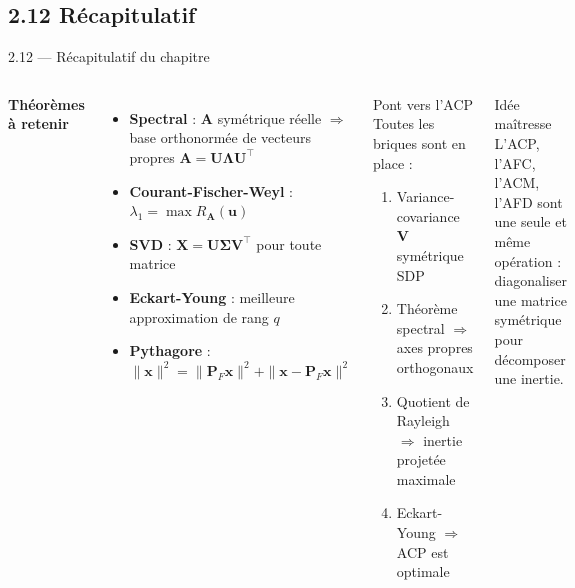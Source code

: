 \subsection{2.12 Récapitulatif}
\begin{frame}{2.12 — Récapitulatif du chapitre}
\begin{columns}[T]
\textbf{Théorèmes à retenir}
\begin{itemize}\small
  \item \textbf{Spectral} : $\mathbf{A}$ symétrique réelle
        $\Rightarrow$ base orthonormée de vecteurs propres
        $\mathbf{A} = \mathbf{U}\mathbf{\Lambda}\mathbf{U}^\top$
  \item \textbf{Courant-Fischer-Weyl} : $\lambda_1 = \max R_{\mathbf{A}}(\mathbf{u})$
  \item \textbf{SVD} : $\mathbf{X} = \mathbf{U}\mathbf{\Sigma}\mathbf{V}^\top$ pour toute matrice
  \item \textbf{Eckart-Young} : meilleure approximation de rang $q$
  \item \textbf{Pythagore} : $\|\mathbf{x}\|^2 = \|\mathbf{P}_F\mathbf{x}\|^2 + \|\mathbf{x} - \mathbf{P}_F\mathbf{x}\|^2$
\end{itemize}

\begin{block}{Pont vers l'ACP}
Toutes les briques sont en place :
\begin{enumerate}\small
  \item Variance-covariance $\mathbf{V}$ symétrique SDP
  \item Théorème spectral $\Rightarrow$ axes propres orthogonaux
  \item Quotient de Rayleigh $\Rightarrow$ inertie projetée maximale
  \item Eckart-Young $\Rightarrow$ ACP est optimale
\end{enumerate}
\end{block}

\begin{alertblock}{Idée maîtresse}
L'ACP, l'AFC, l'ACM, l'AFD sont \alert{une seule et même opération} :
diagonaliser une matrice symétrique pour décomposer une inertie.
\end{alertblock}
\end{columns}
\end{frame}

